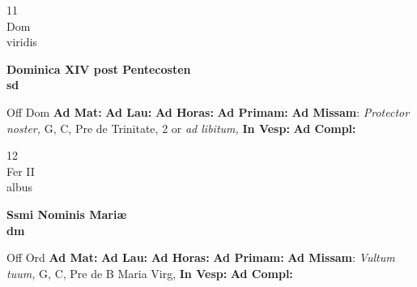 \documentclass[10pt, openany]{book}
\begin{document}
    \begin{center}
        \begin{minipage}{3.5in}
            \vspace{2em}
            \begin{minipage}{0.5in}
                {\Huge 11} \\
                {\normalsize Dom} \\
                {\normalsize viridis}
            \end{minipage}
            \begin{minipage}{3.0in}
                \textbf{ \large Dominica XIV post Pentecosten \\
                \textnormal{\normalsize sd}} \\ 
            \end{minipage}
            \begin{justify}Off Dom
                \textbf{Ad Mat: }
                \textbf{Ad Lau: }
                \textbf{Ad Horas: }
                \textbf{Ad Primam: }\textbf{Ad Missam}: \textit{Protector noster,} G, C, Pre de Trinitate, 2 or \textit{ad libitum,}  
                \textbf{In Vesp: }
                \textbf{Ad Compl: }
            \end{justify}
        \end{minipage}
    \end{center}

    \begin{center}
        \begin{minipage}{3.5in}
            \vspace{2em}
            \begin{minipage}{0.5in}
                {\Huge 12} \\
                {\normalsize Fer II} \\
                {\normalsize albus}
            \end{minipage}
            \begin{minipage}{3.0in}
                \textbf{ \large Ssmi Nominis Mariæ \\
                \textnormal{\normalsize dm}} \\ 
            \end{minipage}
            \begin{justify}Off Ord
                \textbf{Ad Mat: }
                \textbf{Ad Lau: }
                \textbf{Ad Horas: }
                \textbf{Ad Primam: }\textbf{Ad Missam}: \textit{Vultum tuum,} G, C, Pre de B Maria Virg,  
                \textbf{In Vesp: }
                \textbf{Ad Compl: }
            \end{justify}
        \end{minipage}
    \end{center}
\end{document}
